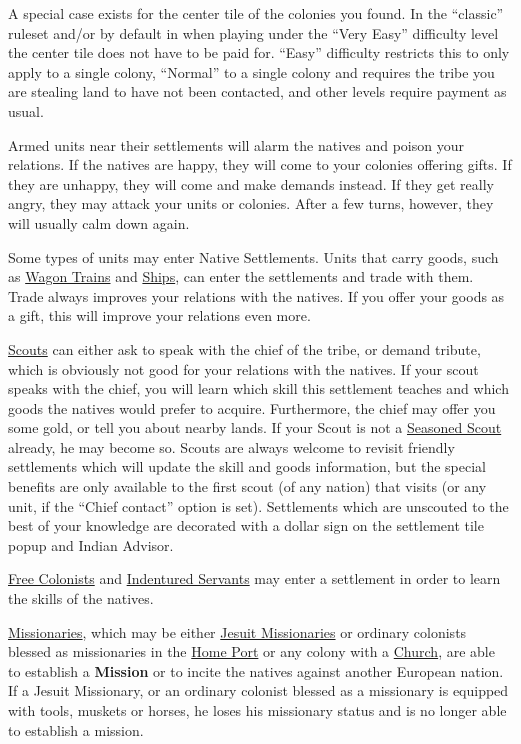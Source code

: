 \documentclass[12pt]{book}
\newcommand{\Concept}[1]{\index{#1}\hypertarget{#1}{\textbf{#1}}}
\begin{document}
A special case exists for the center tile of the colonies you found.
In the ``classic'' ruleset and/or by default in when playing under the
``Very Easy'' difficulty level the center tile does not have to be
paid for. ``Easy'' difficulty restricts this to only apply to a
single colony, ``Normal'' to a single colony and requires the tribe
you are stealing land to have not been contacted, and other levels
require payment as usual.

Armed units near their settlements will alarm the natives and poison
your relations. If the natives are happy, they will come to your
colonies offering gifts. If they are unhappy, they will come and make
demands instead. If they get really angry, they may attack your units
or colonies. After a few turns, however, they will usually calm down
again.

Some types of units may enter Native Settlements. Units that carry
goods, such as \hyperlink{Wagon Train}{Wagon Trains} and
\hyperlink{Naval Units}{Ships}, can enter the settlements and trade
with them. Trade always improves your relations with the natives. If
you offer your goods as a gift, this will improve your relations even
more.

\hyperlink{Scout}{Scouts} can either ask to speak with the chief of
the tribe, or demand tribute, which is obviously not good for your
relations with the natives. If your scout speaks with the chief, you
will learn which skill this settlement teaches and which goods the
natives would prefer to acquire. Furthermore, the chief may offer you
some gold, or tell you about nearby lands. If your Scout is not a
\hyperlink{Seasoned Scout}{Seasoned Scout} already, he may become so.
Scouts are always welcome to revisit friendly settlements which will
update the skill and goods information, but the special benefits are
only available to the first scout (of any nation) that visits (or any
unit, if the ``Chief contact'' option is set). Settlements which are
unscouted to the best of your knowledge are decorated with a dollar
sign on the settlement tile popup and Indian Advisor.

\hyperlink{Free Colonist}{Free Colonists} and \hyperlink{Indentured
Servant}{Indentured Servants} may enter a settlement in order to learn
the skills of the natives.

\hyperlink{Missionary}{Missionaries}, which may be either
\hyperlink{Jesuit Missionary}{Jesuit Missionaries} or ordinary
colonists blessed as missionaries in the \hyperlink{Home Port}{Home
  Port} or any colony with a \hyperlink{Church}{Church}, are able to
establish a \Concept{Mission} or to incite the natives against another
European nation. If a Jesuit Missionary, or an ordinary colonist
blessed as a missionary is equipped with tools, muskets or horses, he
loses his missionary status and is no longer able to establish a
mission.
\end{document}
